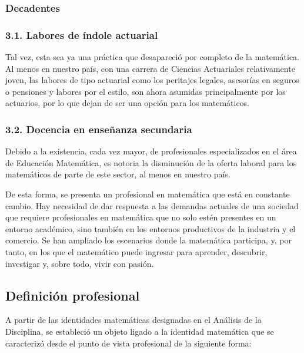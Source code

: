 \subsubsection{Decadentes}

\subsubsection*{ 3.1. Labores de índole actuarial}

Tal vez, esta sea ya una práctica que desapareció por completo de la matemática. Al menos en nuestro país, con una carrera de Ciencias Actuariales relativamente joven, las labores de tipo actuarial como los peritajes legales, asesorías en seguros o pensiones y labores por el estilo, son ahora asumidas principalmente por los actuarios, por lo que dejan de ser una opción para los matemáticos.


\subsubsection*{3.2. Docencia en enseñanza secundaria}

Debido a la existencia, cada vez mayor, de profesionales especializados en el área de Educación Matemática, es notoria la disminución de la oferta laboral para los matemáticos de parte de este sector, al menos en nuestro país.  

De esta forma, se presenta un profesional en matemática que está en constante cambio. Hay necesidad de dar respuesta a las demandas actuales de una sociedad que requiere profesionales en matemática que no solo estén presentes en un entorno académico, sino también en los entornos productivos de la industria y el comercio. Se han ampliado los escenarios donde la matemática participa, y, por tanto, en los que el matemático puede ingresar para aprender, descubrir, investigar y, sobre todo, vivir con pasión.

\subsection{Definición profesional}

A partir de las identidades matemáticas designadas en el Análisis de la Disciplina, se estableció un objeto ligado a la identidad matemática que se caracterizó desde el punto de vista profesional de la siguiente forma:


